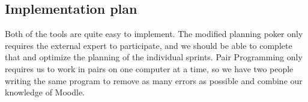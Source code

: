 \subsection{Implementation plan}
Both of the tools are quite easy to implement. The modified planning poker only requires the external expert to participate, and we should be able to complete that and optimize the planning of the individual sprints. Pair Programming only requires us to work in pairs on one computer at a time, so we have two people writing the same program to remove as many errors as possible and combine our knowledge of Moodle.

